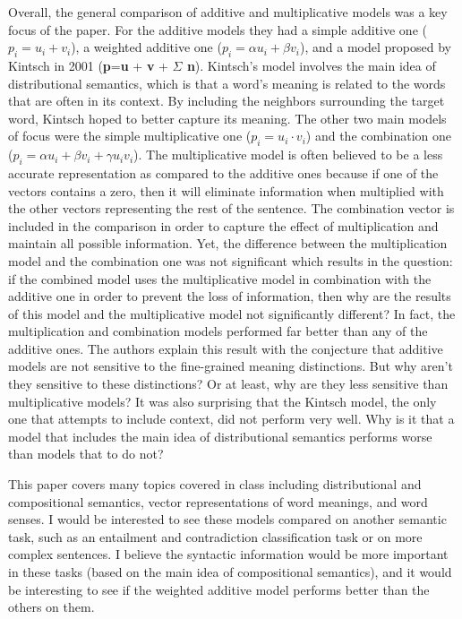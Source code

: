 \documentclass{article}
\begin{document}
Overall, the general comparison of additive and multiplicative models was a key focus of the paper.  For the additive models they had a simple additive one ($p_i = u_i + v_i$), a weighted additive one ($p_i = \alpha u_i + \beta v_i$), and a model proposed by Kintsch in 2001 (\textbf{p}=\textbf{u} + \textbf{v} + \textbf{ $\Sigma$ n}).  Kintsch's model involves the main idea of distributional semantics, which is that a word's meaning is related to the words that are often in its context.  By including the neighbors surrounding the target word, Kintsch hoped to better capture its meaning.  The other two main models of focus were the simple multiplicative one ($p_i=u_i \cdot v_i$) and the combination one ($p_i= \alpha u_i + \beta v_i + \gamma u_i v_i$).  The multiplicative model is often believed to be a less accurate representation as compared to the additive ones because if one of the vectors contains a zero, then it will eliminate information when multiplied with the other vectors representing the rest of the sentence.  The combination vector is included in the comparison in order to capture the effect of multiplication and maintain all possible information.  Yet, the difference between the multiplication model and the combination one was not significant which results in the question: if the combined model uses the multiplicative model in combination with the additive one in order to prevent the loss of information, then why are the results of this model and the multiplicative model not significantly different?  In fact, the multiplication and combination models performed far better than any of the additive ones. The authors explain this result with the conjecture that additive models are not sensitive to the fine-grained meaning distinctions.  But why aren't they sensitive to these distinctions?  Or at least, why are they less sensitive than multiplicative models? It was also surprising that the Kintsch model, the only one that attempts to include context, did not perform very well.  Why is it that a model that includes the main idea of distributional semantics performs worse than models that to do not?  

This paper covers many topics covered in class including distributional and compositional semantics,  vector representations of word meanings, and word senses.  I would be interested to see these models compared on another semantic task, such as an entailment and contradiction classification task or on more complex sentences. I believe the syntactic information would be more important in these tasks (based on the main idea of compositional semantics), and it would be interesting to see if the weighted additive model performs better than the others on them.
\end{document}
